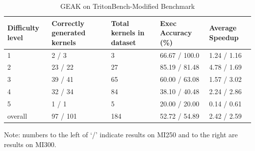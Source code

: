 \begin{table}
 \caption{GEAK on TritonBench-Modified Benchmark }
  \centering
  \begin{threeparttable}
  \begin{tabular}{lllll}
    \toprule
    Difficulty level & Correctly generated kernels & Total kernels in dataset & Exec Accuracy (\%) & Average Speedup  \\
    \midrule
    1 & 2 / 3 & 3 & 66.67 / 100.0 & 1.24 / 1.16 \\
    2 & 23 / 22 & 27 & 85.19 / 81.48 & 4.78 / 1.69 \\
    3 & 39 / 41 & 65 & 60.00 / 63.08 & 1.57 / 3.02 \\
    4 & 32 / 34 & 84 & 38.10 / 40.48 & 2.24 / 2.86 \\
    5 & 1 / 1 & 5 & 20.00 / 20.00 & 0.14 / 0.61 \\
    \midrule
    overall & 97 / 101 & 184 & 52.72 / 54.89 & 2.42 / 2.59 \\
    \bottomrule
  \end{tabular}
  \label{tab:geak_on_tritonbench}
  \begin{tablenotes}
  \small
\item Note:  numbers to the left of ‘/’ indicate results on MI250 and to the right are results on MI300.
\end{tablenotes}
  \end{threeparttable}
\end{table}